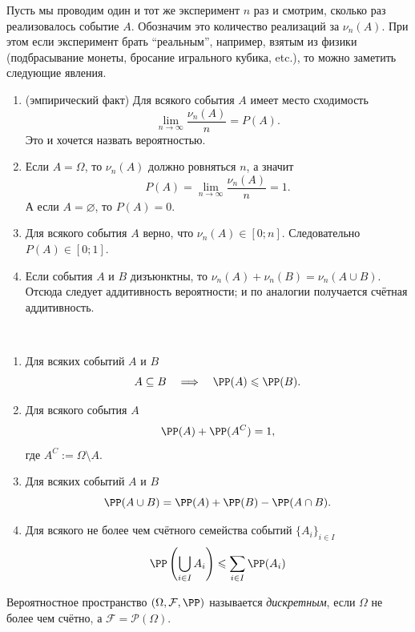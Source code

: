 \documentclass[12pt,a4paper]{article}
\begin{document}
    \begin{remark*}
        Пусть мы проводим один и тот же эксперимент $n$ раз и смотрим, сколько раз реализовалось событие $A$. Обозначим это количество реализаций за $\nu_n(A)$. При этом если эксперимент брать ``реальным'', например, взятым из физики (подбрасывание монеты, бросание игрального кубика, etc.), то можно заметить следующие явления.
        \begin{enumerate}
            \item (эмпирический факт) Для всякого события $A$ имеет место сходимость
                \[\lim_{n \to \infty} \frac{\nu_n(A)}{n} = P(A).\]
                Это и хочется назвать вероятностью.
            \item Если $A = \Omega$, то $\nu_n(A)$ должно ровняться $n$, а значит
                \[P(A) = \lim_{n \to \infty} \frac{\nu_n(A)}{n} = 1.\]
                А если $A = \varnothing$, то $P(A) = 0$.
            \item Для всякого события $A$ верно, что $\nu_n(A) \in [0; n]$. Следовательно $P(A) \in [0; 1]$.
            \item Если события $A$ и $B$ дизъюнктны, то $\nu_n(A) + \nu_n(B) = \nu_n(A \cup B)$. Отсюда следует аддитивность вероятности; и по аналогии получается счётная аддитивность.
        \end{enumerate}
    \end{remark*}

    \begin{lemma}\ 
        \begin{enumerate}
            \item Для всяких событий $A$ и $B$
                \[A \subseteq B \quad \Longrightarrow \quad \PP(A) \leqslant \PP(B).\]
            \item Для всякого события $A$
                \[\PP(A) + \PP(A^C) = 1,\]
                где $A^C := \Omega \setminus A$.
            \item Для всяких событий $A$ и $B$
                \[\PP(A \cup B) = \PP(A) + \PP(B) - \PP(A \cap B).\]
            \item Для всякого не более чем счётного семейства событий $\{A_i\}_{i \in I}$
                \[\PP\left(\bigcup_{i \in I} A_i\right) \leqslant \sum_{i \in I} \PP(A_i)\]
        \end{enumerate}
    \end{lemma}

    \begin{definition}
        Вероятностное пространство $(\Omega, \mathcal{F}, \PP)$ называется \emph{дискретным}, если $\Omega$ не более чем счётно, а $\mathcal{F} = \mathcal{P}(\Omega)$.
    \end{definition}
\end{document}
